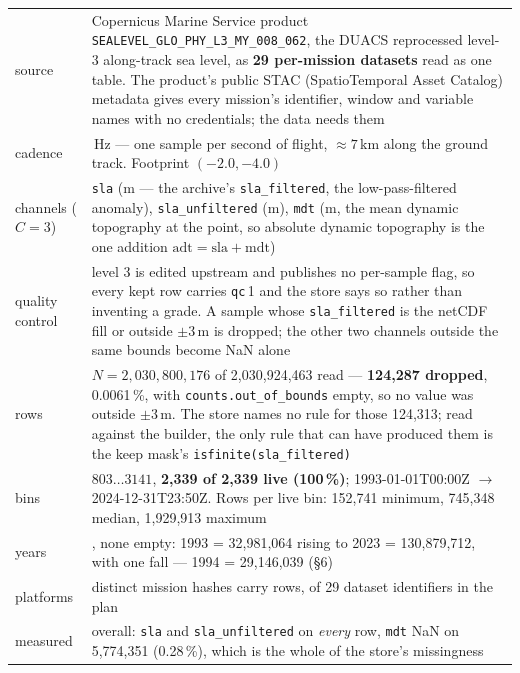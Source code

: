 \documentclass[10pt]{article}
\newcommand{\code}[1]{\texttt{#1}}
\begin{document}
\begin{table}[h]
\centering\setlength{\tabcolsep}{5pt}\footnotesize
\begin{tabular}{@{}>{\raggedright\arraybackslash}p{2.8cm}>{\raggedright\arraybackslash}p{12.5cm}@{}}
\toprule
source & Copernicus Marine Service product \code{SEALEVEL\_GLO\_PHY\_L3\_MY\_008\_062}, the DUACS reprocessed level-3 along-track sea level, as \textbf{29 per-mission datasets} read as one table. The product's public STAC (SpatioTemporal Asset Catalog) metadata gives every mission's identifier, window and variable names with no credentials; the data needs them \\
cadence & 1\,Hz --- one sample per second of flight, $\approx 7$\,km along the ground track. Footprint $(-2.0, -4.0)$ \\
channels ($C = 3$) & \code{sla} (m --- the archive's \code{sla\_filtered}, the low-pass-filtered anomaly), \code{sla\_unfiltered} (m), \code{mdt} (m, the mean dynamic topography at the point, so absolute dynamic topography is the one addition $\mathrm{adt} = \mathrm{sla} + \mathrm{mdt}$) \\
quality control & level 3 is edited upstream and publishes no per-sample flag, so every kept row carries \code{qc}\,1 and the store says so rather than inventing a grade. A sample whose \code{sla\_filtered} is the netCDF fill or outside $\pm 3$\,m is dropped; the other two channels outside the same bounds become NaN alone \\
rows & $N = 2{,}030{,}800{,}176$ of 2,030,924,463 read --- \textbf{124,287 dropped}, 0.0061\,\%, with \code{counts.out\_of\_bounds} empty, so no value was outside $\pm 3$\,m. The store names no rule for those 124,313; read against the builder, the only rule that can have produced them is the keep mask's \code{isfinite(sla\_filtered)} \\
bins & $803 \ldots 3141$, \textbf{2,339 of 2,339 live (100\,\%)}; 1993-01-01T00:00Z $\to$ 2024-12-31T23:50Z. Rows per live bin: 152,741 minimum, 745,348 median, 1,929,913 maximum \\
years & 32, none empty: 1993 = 32,981,064 rising to 2023 = 130,879,712, with one fall --- 1994 = 29,146,039 (§6) \\
platforms & 28 distinct mission hashes carry rows, of 29 dataset identifiers in the plan \\
measured & 0.999052 overall: \code{sla} and \code{sla\_unfiltered} on \emph{every} row, \code{mdt} NaN on 5,774,351 (0.28\,\%), which is the whole of the store's missingness \\

\end{tabular}
\end{table}
\end{document}
